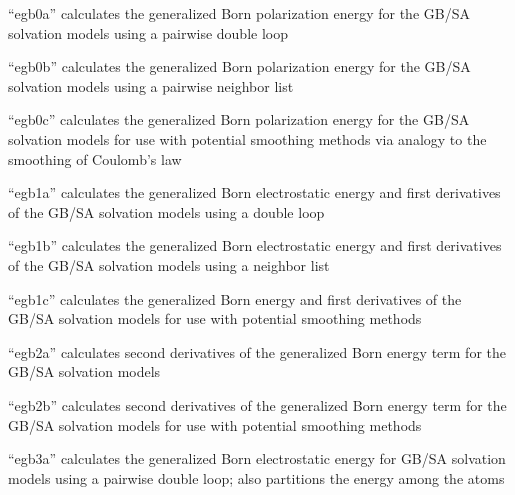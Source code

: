 \documentclass[letterpaper,11pt,english]{sphinxmanual}
\begin{document}
\sphinxAtStartPar
“egb0a” calculates the generalized Born polarization energy for the GB/SA solvation models using a pairwise double loop

\sphinxAtStartPar
{}

\sphinxAtStartPar
“egb0b” calculates the generalized Born polarization energy for the GB/SA solvation models using a pairwise neighbor list

\sphinxAtStartPar
{}

\sphinxAtStartPar
“egb0c” calculates the generalized Born polarization energy for the GB/SA solvation models for use with potential smoothing methods via analogy to the smoothing of Coulomb’s law

\sphinxAtStartPar
{}

\sphinxAtStartPar
“egb1a” calculates the generalized Born electrostatic energy and first derivatives of the GB/SA solvation models using a double loop

\sphinxAtStartPar
{}

\sphinxAtStartPar
“egb1b” calculates the generalized Born electrostatic energy and first derivatives of the GB/SA solvation models using a neighbor list

\sphinxAtStartPar
{}

\sphinxAtStartPar
“egb1c” calculates the generalized Born energy and first derivatives of the GB/SA solvation models for use with potential smoothing methods

\sphinxAtStartPar
{}

\sphinxAtStartPar
“egb2a” calculates second derivatives of the generalized Born energy term for the GB/SA solvation models

\sphinxAtStartPar
{}

\sphinxAtStartPar
“egb2b” calculates second derivatives of the generalized Born energy term for the GB/SA solvation models for use with potential smoothing methods

\sphinxAtStartPar
{}

\sphinxAtStartPar
“egb3a” calculates the generalized Born electrostatic energy for GB/SA solvation models using a pairwise double loop; also partitions the energy among the atoms

\sphinxAtStartPar
{}
\end{document}
